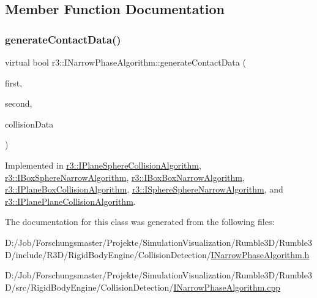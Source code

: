 \subsection{Member Function Documentation}
\mbox{\label{classr3_1_1_i_narrow_phase_algorithm_a606fe8de5fe81ff45fedb81ca74717c3}} 
\subsubsection{\texorpdfstring{generate\+Contact\+Data()}{generateContactData()}}
{\footnotesize\ttfamily virtual bool r3\+::\+I\+Narrow\+Phase\+Algorithm\+::generate\+Contact\+Data (\begin{DoxyParamCaption}\item[{\mbox{\hyperlink{classr3_1_1_rigid_body}{Rigid\+Body}} $\ast$}]{first,  }\item[{\mbox{\hyperlink{classr3_1_1_rigid_body}{Rigid\+Body}} $\ast$}]{second,  }\item[{\mbox{\hyperlink{classr3_1_1_collision_data}{Collision\+Data}} \&}]{collision\+Data }\end{DoxyParamCaption})\hspace{0.3cm}{\ttfamily [pure virtual]}}



Implemented in \mbox{\hyperlink{classr3_1_1_i_plane_sphere_collision_algorithm_a5b1c334d90d381e089d59cb59a7714c5}{r3\+::\+I\+Plane\+Sphere\+Collision\+Algorithm}}, \mbox{\hyperlink{classr3_1_1_i_box_sphere_narrow_algorithm_aeecdb2486c6e6cbae057466f05323bdb}{r3\+::\+I\+Box\+Sphere\+Narrow\+Algorithm}}, \mbox{\hyperlink{classr3_1_1_i_box_box_narrow_algorithm_a4b06ee2be38c248c59195082db64c3e3}{r3\+::\+I\+Box\+Box\+Narrow\+Algorithm}}, \mbox{\hyperlink{classr3_1_1_i_plane_box_collision_algorithm_aacbbfc59a3cb174876bd5cffad22f1fc}{r3\+::\+I\+Plane\+Box\+Collision\+Algorithm}}, \mbox{\hyperlink{classr3_1_1_i_sphere_sphere_narrow_algorithm_acfdb8ae3db8c91843216651768cbd4e2}{r3\+::\+I\+Sphere\+Sphere\+Narrow\+Algorithm}}, and \mbox{\hyperlink{classr3_1_1_i_plane_plane_collision_algorithm_a910587be6f6537f86bbcc5e3a9b40223}{r3\+::\+I\+Plane\+Plane\+Collision\+Algorithm}}.



The documentation for this class was generated from the following files\+:\begin{DoxyCompactItemize}
\item 
D\+:/\+Job/\+Forschungsmaster/\+Projekte/\+Simulation\+Visualization/\+Rumble3\+D/\+Rumble3\+D/include/\+R3\+D/\+Rigid\+Body\+Engine/\+Collision\+Detection/\mbox{\hyperlink{_i_narrow_phase_algorithm_8h}{I\+Narrow\+Phase\+Algorithm.\+h}}\item 
D\+:/\+Job/\+Forschungsmaster/\+Projekte/\+Simulation\+Visualization/\+Rumble3\+D/\+Rumble3\+D/src/\+Rigid\+Body\+Engine/\+Collision\+Detection/\mbox{\hyperlink{_i_narrow_phase_algorithm_8cpp}{I\+Narrow\+Phase\+Algorithm.\+cpp}}\end{DoxyCompactItemize}
